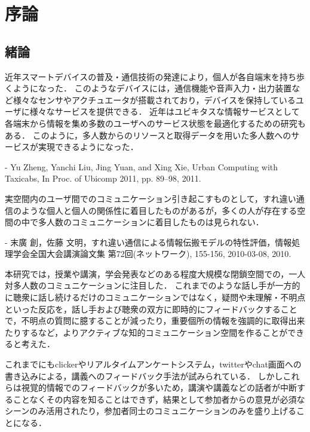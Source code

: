 \chapter{序論}


\section{緒論}
\clearpage



近年スマートデバイスの普及・通信技術の発達により，個人が各自端末を持ち歩くようになった．
このようなデバイスには，通信機能や音声入力・出力装置など様々なセンサやアクチュエータが搭載されており，デバイスを保持しているユーザに様々なサービスを提供できる．
近年はユビキタスな情報サービスとして各端末から情報を集め多数のユーザへのサービス状態を最適化するための研究もある．
このように，多人数からのリソースと取得データを用いた多人数へのサービスが実現できるようになった．

- Yu Zheng, Yanchi Liu, Jing Yuan, and Xing Xie, Urban Computing with Taxicabs, In Proc. of Ubicomp 2011, pp. 89--98, 2011.

実空間内のユーザ間でのコミュニケーション引き起こすものとして，すれ違い通信のような個人と個人の関係性に着目したものがあるが，多くの人が存在する空間の中で多人数のコミュニケーションに着目したものは見られない．

- 末廣 創，佐藤 文明，すれ違い通信による情報伝搬モデルの特性評価，情報処理学会全国大会講演論文集 第72回(ネットワーク), 155-156, 2010-03-08, 2010.

本研究では，授業や講演，学会発表などのある程度大規模な閉鎖空間での，一人対多人数のコミュニケーションに注目した．
これまでのような話し手が一方的に聴衆に話し続けるだけのコミュニケーションではなく，疑問や未理解・不明点といった反応を，話し手および聴衆の双方に即時的にフィードバックすることで，不明点の質問に臆することが減ったり，重要個所の情報を強調的に取得出来たりするなど，よりアクティブな知的コミュニケーション空間を作ることができると考えた．

これまでにもclickerやリアルタイムアンケートシステム，twitterやchat画面への書き込みによる，講義へのフィードバック手法が試みられている．
しかしこれらは視覚的情報でのフィードバックが多いため，講演や講義などの話者が中断することなくその内容を知ることはできず，結果として参加者からの意見が必須なシーンのみ活用されたり，参加者同士のコミュニケーションのみを盛り上げることになる．

